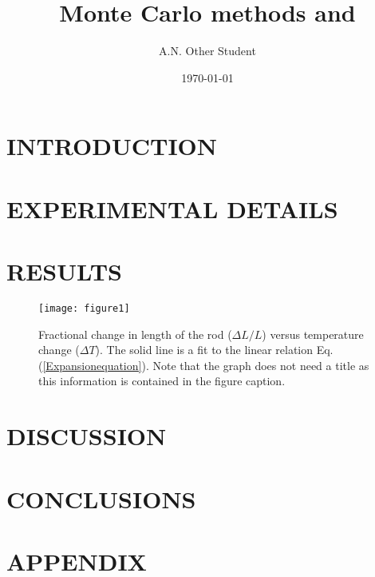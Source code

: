 \documentclass[twocolumn,prl,nobalancelastpage,aps,10pt]{revtex4-1}
\begin{document}
\title{Monte Carlo methods and }

\author{A.N. Other Student}


\begin{abstract} 

\end{abstract}
\date{\today}

\maketitle

\section{INTRODUCTION}




\section{EXPERIMENTAL DETAILS}



\section{RESULTS}


\begin{figure}
\texttt{[image: figure1]}
\caption{Fractional change in length of the rod ($\Delta L/L$) versus temperature change ($\Delta T$). The solid line
is a fit to the linear relation Eq. (\ref{Expansionequation}). Note that the graph does not need a title as this information is contained in the figure caption.} \label{expansionfigure}
\end{figure}





\section{DISCUSSION}



\section{CONCLUSIONS}



\section{APPENDIX}
\end{document}
